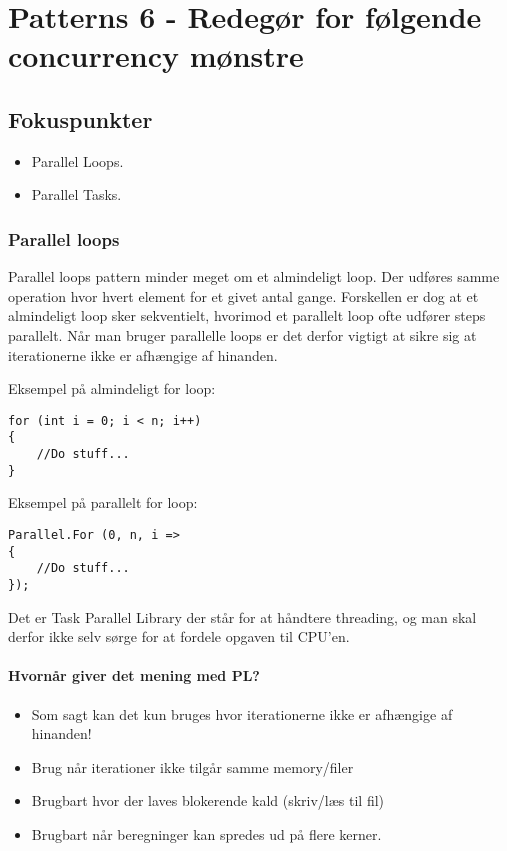 \section{Patterns 6 - Redegør for følgende concurrency mønstre}

\subsection{Fokuspunkter}

\begin{itemize}
	\item Parallel Loops.
	\item Parallel Tasks.
\end{itemize}

\subsubsection{Parallel loops}

Parallel loops pattern minder meget om et almindeligt loop. Der udføres samme operation hvor hvert element for et givet antal gange. Forskellen er dog at et almindeligt loop sker sekventielt, hvorimod et parallelt loop ofte udfører steps parallelt. Når man bruger parallelle loops er det derfor vigtigt at sikre sig at iterationerne ikke er afhængige af hinanden.

Eksempel på almindeligt for loop:

\begin{lstlisting}[caption=Normal for loop, label=code:normalLoop]
for (int i = 0; i < n; i++)
{
	//Do stuff...
}
\end{lstlisting}

Eksempel på parallelt for loop:

\begin{lstlisting}[caption=Parallel for loop,  label=code:paraLoop,
morekeywords={Parallel, For}]
Parallel.For (0, n, i =>
{
	//Do stuff...
});
\end{lstlisting}

Det er Task Parallel Library der står for at håndtere threading, og man skal derfor ikke selv sørge for at fordele opgaven til CPU'en. 

\paragraph{Hvornår giver det mening med PL?}
\begin{itemize}
	\item Som sagt kan det kun bruges hvor iterationerne ikke er afhængige af hinanden!
	\item Brug når iterationer ikke tilgår samme memory/filer
	\item Brugbart hvor der laves blokerende kald (skriv/læs til fil)
	\item Brugbart når beregninger kan spredes ud på flere kerner.
\end{itemize}

